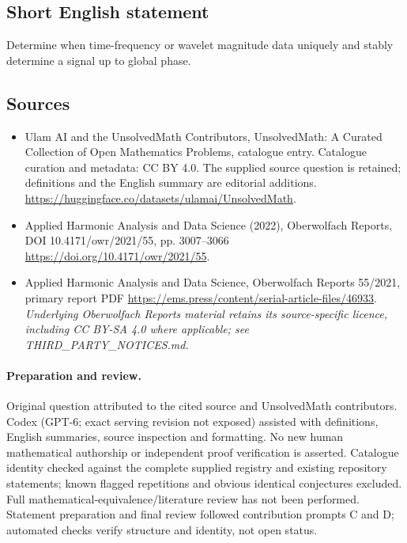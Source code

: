 \documentclass[11pt]{article}
\begin{document}
\subsection{Short English statement}
Determine when time-frequency or wavelet magnitude data uniquely and stably determine a signal up to global phase.
\subsection{Sources}
\begin{itemize}
\item[\hypertarget{source:statement:1}{S1}] Ulam AI and the UnsolvedMath Contributors, UnsolvedMath: A Curated Collection of Open Mathematics Problems, catalogue entry. Catalogue curation and metadata: CC BY 4.0. The supplied source question is retained; definitions and the English summary are editorial additions.
\url{https://huggingface.co/datasets/ulamai/UnsolvedMath}.
\item[\hypertarget{source:statement:2}{S2}] Applied Harmonic Analysis and Data Science (2022), Oberwolfach Reports, DOI 10.4171/owr/2021/55, pp. 3007--3066
\url{https://doi.org/10.4171/owr/2021/55}.
\item[\hypertarget{source:statement:3}{S3}] Applied Harmonic Analysis and Data Science, Oberwolfach Reports 55/2021, primary report PDF
\url{https://ems.press/content/serial-article-files/46933}.
\textit{Underlying Oberwolfach Reports material retains its source-specific licence, including CC BY-SA 4.0 where applicable; see THIRD\_PARTY\_NOTICES.md.}
\end{itemize}
\paragraph{Preparation and review.}
Original question attributed to the cited source and UnsolvedMath contributors. Codex (GPT-6; exact serving revision not exposed) assisted with definitions, English summaries, source inspection and formatting. No new human mathematical authorship or independent proof verification is asserted. Catalogue identity checked against the complete supplied registry and existing repository statements; known flagged repetitions and obvious identical conjectures excluded. Full mathematical-equivalence/literature review has not been performed. Statement preparation and final review followed contribution prompts C and D; automated checks verify structure and identity, not open status.
\label{end:statement}
\end{document}

